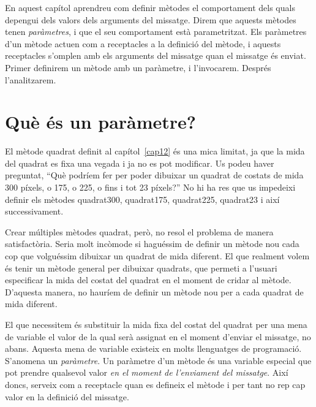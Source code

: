 En aquest capítol aprendreu com definir mètodes el comportament dels quals depengui dels valors dels arguments del missatge. Direm que aquests mètodes tenen \emph{paràmetres}, i que el seu comportament està parametritzat. Els paràmetres d'un mètode actuen com a receptacles a la definició del mètode, i aquests receptacles s'omplen amb els arguments del missatge quan el missatge és enviat. Primer definirem un mètode amb un paràmetre, i l'invocarem. Després l'analitzarem.

\section{Què és un paràmetre?}
El mètode \textsf{quadrat} definit al capítol~\ref{cap12} és una mica limitat, ja que la mida del quadrat es fixa una vegada i ja no es pot modificar. Us podeu haver preguntat, ``Què podríem fer per poder dibuixar un quadrat de costats de mida 300 píxels, o 175, o 225, o fins i tot 23 píxels?'' No hi ha res que us impedeixi definir els mètodes \textsf{quadrat300}, \textsf{quadrat175}, \textsf{quadrat225}, \textsf{quadrat23} i així successivament.

Crear múltiples mètodes \textsf{quadrat}, però, no resol el problema de manera satisfactòria. Seria molt incòmode si haguéssim de definir un mètode nou cada cop que volguéssim dibuixar un quadrat de mida diferent. El que realment volem és tenir un mètode general per dibuixar quadrats, que permeti a l'usuari especificar la mida del costat del quadrat en el moment de cridar al mètode. D'aquesta manera, no hauríem de definir un mètode nou per a cada quadrat de mida diferent.

El que necessitem és substituir la mida fixa del costat del quadrat per una mena de variable el valor de la qual serà assignat en el moment d'enviar el missatge, no abans. Aquesta mena de variable existeix en molts llenguatges de programació. S'anomena un \emph{paràmetre}. Un paràmetre d'un mètode és una variable especial que pot prendre qualsevol valor \emph{en el moment de l'enviament del missatge}. Així doncs, serveix com a receptacle quan es defineix el mètode i per tant no rep cap valor en la definició del missatge.

